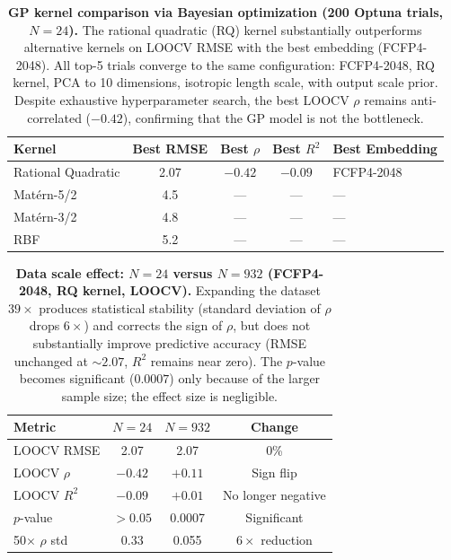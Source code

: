 \documentclass{article}
\begin{document}
\begin{table}[h!]
\centering
\caption{\textbf{GP kernel comparison via Bayesian optimization
(200 Optuna trials, $N = 24$).}
The rational quadratic (RQ) kernel substantially outperforms alternative
kernels on LOOCV RMSE with the best embedding (FCFP4-2048).  All top-5
trials converge to the same configuration: FCFP4-2048, RQ kernel, PCA
to 10 dimensions, isotropic length scale, with output scale prior.
Despite exhaustive hyperparameter search, the best LOOCV $\rho$
remains anti-correlated ($-0.42$), confirming that the GP model is not
the bottleneck.}
\label{tab:kernel_comparison}
\begin{tabular}{@{}lcccl@{}}
\toprule
Kernel & Best RMSE & Best $\rho$ & Best $R^{2}$ & Best Embedding \\
\midrule
Rational Quadratic & 2.07  & $-0.42$ & $-0.09$ & FCFP4-2048 \\
Mat\'ern-5/2       & 4.5   & ---     & ---     & --- \\
Mat\'ern-3/2       & 4.8   & ---     & ---     & --- \\
RBF                & 5.2   & ---     & ---     & --- \\
\bottomrule
\end{tabular}
\end{table}

\begin{table}[h!]
\centering
\caption{\textbf{Data scale effect: $N = 24$ versus $N = 932$
(FCFP4-2048, RQ kernel, LOOCV).}
Expanding the dataset $39\times$ produces statistical stability
(standard deviation of $\rho$ drops $6\times$) and corrects the sign of
$\rho$, but does not substantially improve predictive accuracy
(RMSE unchanged at ${\sim}2.07$, $R^{2}$ remains near zero).
The $p$-value becomes significant ($0.0007$) only because of the larger
sample size; the effect size is negligible.}
\label{tab:data_scale}
\begin{tabular}{@{}lccc@{}}
\toprule
Metric & $N = 24$ & $N = 932$ & Change \\
\midrule
LOOCV RMSE    & 2.07  & 2.07  & 0\% \\
LOOCV $\rho$  & $-0.42$ & $+0.11$ & Sign flip \\
LOOCV $R^{2}$ & $-0.09$ & $+0.01$ & No longer negative \\
$p$-value     & $>0.05$ & 0.0007 & Significant \\
50$\times$ $\rho$ std & 0.33  & 0.055 & $6\times$ reduction \\
\bottomrule
\end{tabular}
\end{table}
\end{document}
